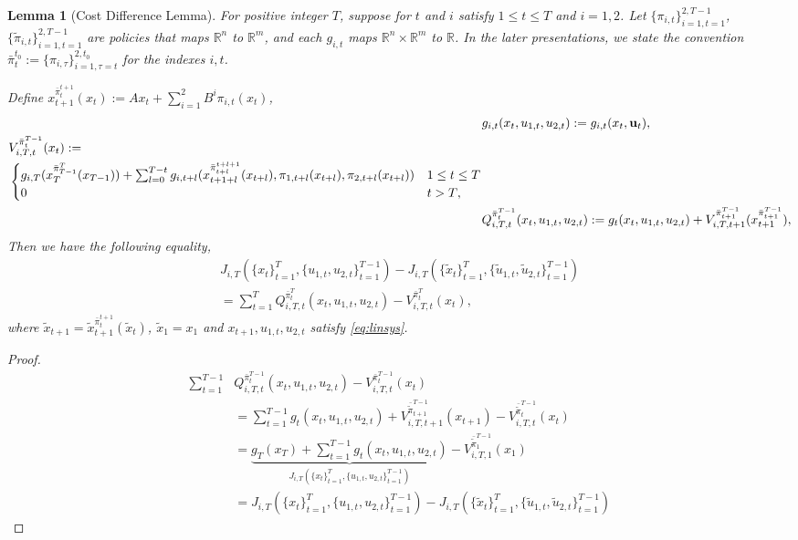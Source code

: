 \documentclass[letterpaper, 10 pt, conference]{ieeeconf}  %
\newtheorem{lemma}{Lemma}
\begin{document}
\begin{lemma}[Cost Difference Lemma]
For positive integer $T$, suppose for $t$ and $i$ satisfy $1 \leq t \leq T$ and $i = 1,2$. Let 
$\{\pi_{i,t}\}_{i=1,t=1}^{2,T-1}$,$\{\tilde{\pi}_{i,t}\}_{i=1,t=1}^{2,T-1}$ are policies that maps $\mathbb{R}^{n}$ to $\mathbb{R}^{m}$, and each $g_{i,t}$ maps $\mathbb{R}^{n} \times \mathbb{R}^{m}$ to $\mathbb{R}$. In the later presentations, we state the convention $\bar{\pi}_{t}^{t_{0}} := \{\pi_{i,\tau}\}_{i=1,\tau=t}^{2,t_{0}}$ for the indexes $i,t$.

Define $x_{t+1}^{\bar{\pi}_{t}^{t+1}}(x_{t}):= Ax_{t} + \sum_{i=1}^{2} B^{i}\pi_{i,t}(x_{t})$,
\begin{align}
&g_{i,t}(x_{t}, u_{1,t}, u_{2,t}) := g_{i,t}(x_{t}, \mathbf{u}_{t}),\\
\begin{split}
    &V_{i,T,t}^{\bar{\pi}_{t}^{T-1}}(x_{t}) := \\
    &\begin{cases}
        g_{i,T}(x_{T}^{\bar{\pi}_{T-1}^{T}}(x_{T-1}))+\sum_{l=0}^{T-t} g_{i,t+l}(x_{t+1+l}^{\bar{\pi}_{t+l}^{t+l+1}}(x_{t+l}),\pi_{1,t+l}(x_{t+l}),\pi_{2,t+l}(x_{t+l})) & \text{$1 \leq t \leq T$}\\
        $0$ & \text{$t > T$},
    \end{cases}
\end{split}
    \\
    &Q_{i,T,t}^{\bar{\pi}_{t}^{T-1}}(x_{t},u_{1,t},u_{2,t}) := g_{t}(x_{t},u_{1,t},u_{2,t}) + V_{i,T,t+1}^{\bar{\pi}_{t+1}^{T-1}}(x_{t+1}^{\bar{\pi}_{t+1}^{T-1}})
    ,
\end{align}
Then we have the following equality,
\begin{align}
    J_{i,T}(\{x_{t}\}_{t=1}^{T},\{u_{1,t},u_{2,t}\}_{t=1}^{T-1}) - J_{i,T}(\{\tilde{x}_{t}\}_{t=1}^{T},\{\tilde{u}_{1,t},\tilde{u}_{2,t}\}_{t=1}^{T-1})\\
    = \sum_{t=1}^{T} Q_{i,T,t}^{\bar{\pi}_{t}^{T}}(x_{t},u_{1,t},u_{2,t}) -  V_{i,T,t}^{\bar{\pi}_{t}^{T}}(x_{t}),
\end{align}
where $\tilde{x}_{t+1} = \tilde{x}_{t+1}^{\bar{\pi}_{t}^{t+1}}(\tilde{x}_{t})$, $\tilde{x}_{1} = x_{1}$ and $x_{t+1},u_{1,t},u_{2,t}$ satisfy \eqref{eq:linsys}.
\end{lemma}

\begin{proof}
\begin{align*}
    \sum_{t=1}^{T-1} &Q_{i,T,t}^{\bar{\pi}_{t}^{T-1}}(x_{t},u_{1,t},u_{2,t}) -  V_{i,T,t}^{\bar{\pi}_{t}^{T-1}}(x_{t}) \\
    &= \sum_{t=1}^{T-1} g_{t}(x_{t},u_{1,t},u_{2,t})+ V_{i,T,t+1}^{\bar{\tilde{\pi}}_{t+1}^{T-1}}(x_{t+1})-V_{i,T,t}^{\bar{\tilde{\pi}}_{t}^{T-1}}(x_{t})\\
    &= \underbrace{g_{T}(x_{T}) + \sum_{t=1}^{T-1} g_{t}(x_{t},u_{1,t},u_{2,t})}_{J_{i,T}(\{x_{t}\}_{t=1}^{T},\{u_{1,t},u_{2,t}\}_{t=1}^{T-1})} - V_{i,T,1}^{\bar{\tilde{\pi}}_{1}^{T-1}}(x_{1})\\
    &= J_{i,T}(\{x_{t}\}_{t=1}^{T},\{u_{1,t},u_{2,t}\}_{t=1}^{T-1}) - J_{i,T}(\{\tilde{x}_{t}\}_{t=1}^{T},\{\tilde{u}_{1,t},\tilde{u}_{2,t}\}_{t=1}^{T-1})
\end{align*}
\end{proof}
\end{document}
